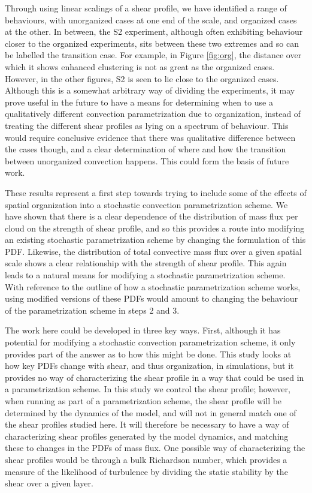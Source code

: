 \documentclass[11pt,a4paper]{article}
\begin{document}
Through using linear scalings of a shear profile, we have identified a range of behaviours, with unorganized cases at one end of the scale, and organized cases at the other. In between, the S2 experiment, although often exhibiting behaviour closer to the organized experiments, sits between these two extremes and so can be labelled the transition case. For example, in Figure \ref{fig:org}, the distance over which it shows enhanced clustering is not as great as the organized cases. However, in the other figures, S2 is seen to lie close to the organized cases. Although this is a somewhat arbitrary way of dividing the experiments, it may prove useful in the future to have a means for determining when to use a qualitatively different convection parametrization due to organization, instead of treating the different shear profiles as lying on a spectrum of behaviour. This would require conclusive evidence that there was qualitative difference between the cases though, and a clear determination of where and how the transition between unorganized convection happens. This could form the basis of future work.

These results represent a first step towards trying to include some of the effects of spatial organization into a stochastic convection parametrization scheme. We have shown that there is a clear dependence of the distribution of mass flux per cloud on the strength of shear profile, and so this provides a route into modifying an existing stochastic parametrization scheme by changing the formulation of this PDF. Likewise, the distribution of total convective mass flux over a given spatial scale shows a clear relationship with the strength of shear profile. This again leads to a natural means for modifying a stochastic parametrization scheme. With reference to the outline of how a stochastic parametrization scheme works, using modified versions of these PDFs would amount to changing the behaviour of the parametrization scheme in steps 2 and 3.

The work here could be developed in three key ways. First, although it has potential for modifying a stochastic convection parametrization scheme, it only provides part of the answer as to how this might be done. This study looks at how key PDFs change with shear, and thus organization, in simulations, but it provides no way of characterizing the shear profile in a way that could be used in a parametrization scheme. In this study we control the shear profile; however, when running as part of a parametrization scheme, the shear profile will be determined by the dynamics of the model, and will not in general match one of the shear profiles studied here. It will therefore be necessary to have a way of characterizing shear profiles generated by the model dynamics, and matching these to changes in the PDFs of mass flux. One possible way of characterizing the shear profiles would be through a bulk Richardson number, which provides a measure of the likelihood of turbulence by dividing the static stability by the shear over a given layer.
\end{document}
